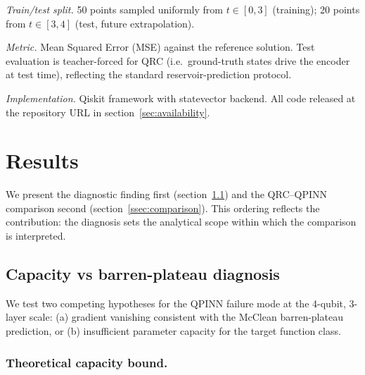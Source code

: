 \documentclass[a4paper,12pt]{iopart}
\begin{document}
\textit{Train/test split.} 50 points sampled uniformly from
$t \in [0, 3]$ (training); 20 points from $t \in [3, 4]$ (test, future
extrapolation).

\textit{Metric.} Mean Squared Error (MSE) against the reference
solution. Test evaluation is teacher-forced for QRC (i.e.~ground-truth
states drive the encoder at test time), reflecting the standard
reservoir-prediction protocol.

\textit{Implementation.} Qiskit framework with statevector backend.
All code released at the repository URL in
section~\ref{sec:availability}.

\section{Results}
\label{sec:results}

We present the diagnostic finding first
(section~\ref{ssec:diagnosis}) and the QRC--QPINN comparison second
(section~\ref{ssec:comparison}). This ordering reflects the
contribution: the diagnosis sets the analytical scope within which
the comparison is interpreted.

\subsection{Capacity vs barren-plateau diagnosis}
\label{ssec:diagnosis}

We test two competing hypotheses for the QPINN failure mode at the
4-qubit, 3-layer scale: (a) gradient vanishing consistent with the
McClean barren-plateau prediction, or (b) insufficient parameter
capacity for the target function class.

\subsubsection*{Theoretical capacity bound.}
\end{document}
